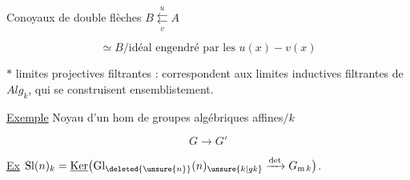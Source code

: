
Conoyaux de double flèches  $B\overset u{\underset v{\leftleftarrows}}A$

\[
\simeq B/\text{idéal engendré par les } u(x)-v(x)
\]

\diagram{\begin{tikzcd}[ampersand replacement=\&,column sep=small,row sep=normal]
\bigl[\quad B\arrow[d]\&A\otimes A\arrow[l,"{(u,v)}"']\arrow[d]\&x\otimes y\arrow[d]\\
C=?\&A\arrow[l]\&xy
\end{tikzcd}}


$*$ limites projectives filtrantes : correspondent aux limites inductives filtrantes de $\mathit{Alg}_k$, qui se construisent ensemblistement.

\uline{Exemple} Noyau d'un hom de groupes algébriques affines$/k$

\[
G\longrightarrow G'
\]

\uline{Ex} $\mathrm{Sl}(n)_k=\underline{\mathrm{Ker}}\bigl(\mathrm{Gl}_{\deleted{\unsure{n}}}(n)_{\unsure{k|gk}}\xrightarrow{\det}G_{\mathrm m\,k}\bigr)$. 

